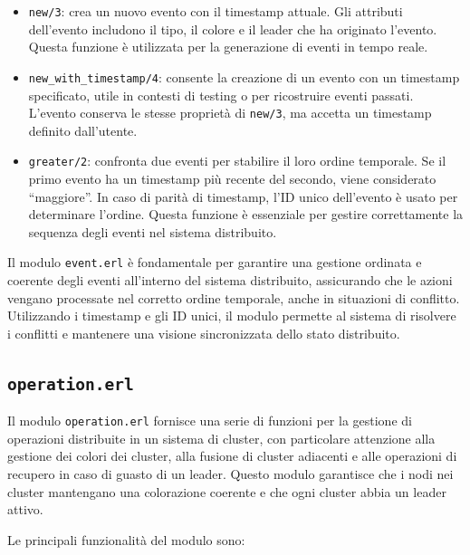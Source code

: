 \documentclass[12pt, a4paper]{report}
\begin{document}
\begin{itemize}
    \item \texttt{new/3}: crea un nuovo evento con il timestamp attuale. Gli attributi dell'evento includono il tipo, il colore e il leader che ha originato l'evento. Questa funzione è utilizzata per la generazione di eventi in tempo reale.

    \item \texttt{new\_with\_timestamp/4}: consente la creazione di un evento con un timestamp specificato, utile in contesti di testing o per ricostruire eventi passati. L'evento conserva le stesse proprietà di \texttt{new/3}, ma accetta un timestamp definito dall'utente.

    \item \texttt{greater/2}: confronta due eventi per stabilire il loro ordine temporale. Se il primo evento ha un timestamp più recente del secondo, viene considerato ``maggiore''. In caso di parità di timestamp, l'ID unico dell'evento è usato per determinare l'ordine. Questa funzione è essenziale per gestire correttamente la sequenza degli eventi nel sistema distribuito.

\end{itemize}

\noindent
Il modulo \texttt{event.erl} è fondamentale per garantire una gestione ordinata e coerente degli eventi all'interno del sistema distribuito, assicurando che le azioni vengano processate nel corretto ordine temporale, anche in situazioni di conflitto. Utilizzando i timestamp e gli ID unici, il modulo permette al sistema di risolvere i conflitti e mantenere una visione sincronizzata dello stato distribuito.

\subsection{\texttt{operation.erl}}

Il modulo \texttt{operation.erl} fornisce una serie di funzioni per la gestione di operazioni distribuite in un sistema di cluster, con particolare attenzione alla gestione dei colori dei cluster, alla fusione di cluster adiacenti e alle operazioni di recupero in caso di guasto di un leader. Questo modulo garantisce che i nodi nei cluster mantengano una colorazione coerente e che ogni cluster abbia un leader attivo.

Le principali funzionalità del modulo sono:
\end{document}
